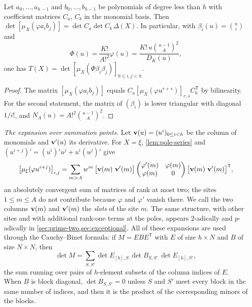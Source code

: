 \begin{lemma}\label{lem:change-of-basis}
Let $a_0,\dots,a_{h-1}$ and $b_0,\dots,b_{h-1}$ be polynomials of degree less than $h$ with
coefficient matrices $C_a$, $C_b$ in the monomial basis. Then
$\det[\mu_X(\varphi a_ib_j)]=\det C_a\det C_b\,\Delta(X)$. In particular, with
$\beta_i(u)=\binom ui$ and
\begin{equation}\label{eq:Phi}
  \Phi(u)=\frac{K!}{A!^2}\varphi(u)=\frac{K!\,u\binom{u-1}{A}^2}{D_K(u)},
\end{equation}
one has $T(X)=\det[\mu_X(\Phi\beta_i\beta_j)]_{0\le i,j<h}$.
\end{lemma}

\begin{proof}
The matrix $[\mu_X(\varphi a_ib_j)]$ equals $C_a[\mu_X(\varphi u^{r+s})]_{r,s}C_b^{\mathsf T}$
by bilinearity. For the second statement, the matrix of $(\beta_i)$ is lower triangular with
diagonal $1/i!$, and $N_A(u)=A!^2\binom{u-1}{A}^2$.
\end{proof}

\emph{The expansion over summation points.} Let $\mathbf{v}(u)=(u^i)_{0\le i<h}$ be the column of monomials and $\mathbf{v}'(u)$ its derivative. For
$X=\xi$, \cref{lem:pole-series} and $(u^{i+j})'=(u^i)'u^j+u^i(u^j)'$ give
\begin{equation}\label{eq:real-sites}
  \bigl[\mu_\xi(\varphi u^{i+j})\bigr]_{i,j}
  =\sum_{m>A}w^m\,\bigl[\mathbf{v}(m)\ \mathbf{v}'(m)\bigr]
  \begin{pmatrix}\varphi'(m)&\varphi(m)\\ \varphi(m)&0\end{pmatrix}
  \bigl[\mathbf{v}(m)\ \mathbf{v}'(m)\bigr]^{\mathsf T},
\end{equation}
an absolutely convergent sum of matrices of rank at most two; the sites $1\le m\le A$ do not
contribute because $\varphi$ and $\varphi'$ vanish there. We call the two columns
$\mathbf{v}(m)$ and $\mathbf{v}'(m)$ the \emph{slots} of the site $m$. The same structure, with other
sites and with additional rank-one terms at the poles, appears $2$-adically and $p$-adically in
\cref{sec:prime-two,sec:exceptional}. All of these expansions are used through the
Cauchy--Binet formula: if $M=EBE^{\mathsf T}$ with $E$ of size $h\times N$ and $B$ of size
$N\times N$, then
\begin{equation}\label{eq:cauchy-binet}
  \det M=\sum_{S,S'}\det E_{[h],S}\,\det B_{S,S'}\,\det E_{[h],S'},
\end{equation}
the sum running over pairs of $h$-element subsets of the column indices of $E$. When $B$ is
block diagonal, $\det B_{S,S'}=0$ unless $S$ and $S'$ meet every block in the same number of
indices, and then it is the product of the corresponding minors of the blocks.

